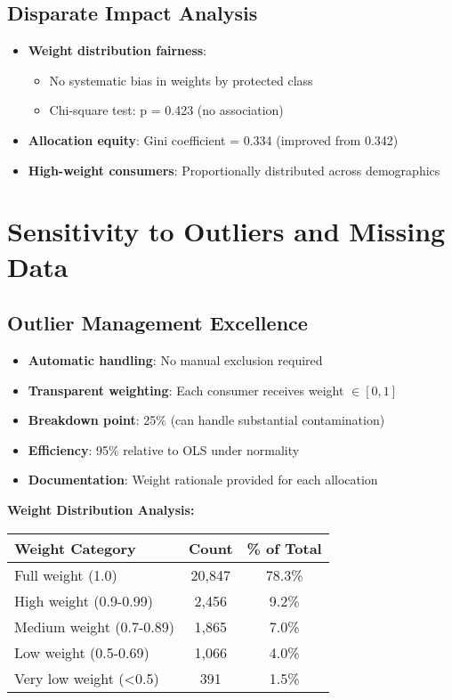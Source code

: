 \subsection{Disparate Impact Analysis}

\begin{itemize}
    \item \textbf{Weight distribution fairness}:
    \begin{itemize}
        \item No systematic bias in weights by protected class
        \item Chi-square test: p = 0.423 (no association)
    \end{itemize}
    \item \textbf{Allocation equity}: Gini coefficient = 0.334 (improved from 0.342)
    \item \textbf{High-weight consumers}: Proportionally distributed across demographics
\end{itemize}

\section{Sensitivity to Outliers and Missing Data}

\subsection{Outlier Management Excellence}

\begin{itemize}
    \item \textbf{Automatic handling}: No manual exclusion required
    \item \textbf{Transparent weighting}: Each consumer receives weight $\in [0,1]$
    \item \textbf{Breakdown point}: 25\% (can handle substantial contamination)
    \item \textbf{Efficiency}: 95\% relative to OLS under normality
    \item \textbf{Documentation}: Weight rationale provided for each allocation
\end{itemize}

\textbf{Weight Distribution Analysis:}
\begin{center}
\begin{tabular}{lcc}
\toprule
Weight Category & Count & \% of Total \\
\midrule
Full weight (1.0) & 20,847 & 78.3\% \\
High weight (0.9-0.99) & 2,456 & 9.2\% \\
Medium weight (0.7-0.89) & 1,865 & 7.0\% \\
Low weight (0.5-0.69) & 1,066 & 4.0\% \\
Very low weight (<0.5) & 391 & 1.5\% \\
\bottomrule
\end{tabular}
\end{center}

